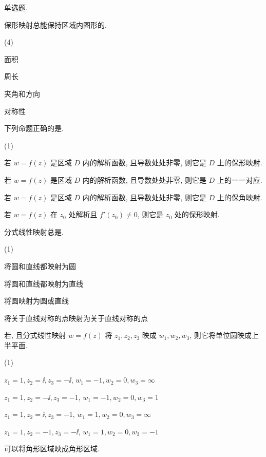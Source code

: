 \begin{homework}
  \item 单选题.
  \begin{homework}
    \item 保形映射总能保持区域内图形的\fillbrace{}.
    \begin{exchoice}(4)
      \item 面积
      \item 周长
      \item 夹角和方向
      \item 对称性
    \end{exchoice}
    \item 下列命题正确的是\fillbrace{}.
    \begin{exchoice}(1)
      \item 若 $w=f(z)$ 是区域 $D$ 内的解析函数, 且导数处处非零, 则它是 $D$ 上的保形映射.
      \item 若 $w=f(z)$ 是区域 $D$ 内的解析函数, 且导数处处非零, 则它是 $D$ 上的一一对应.
      \item 若 $w=f(z)$ 是区域 $D$ 内的解析函数, 且导数处处非零, 则它是 $D$ 上的保角映射.
      \item 若 $w=f(z)$ 在 $z_0$ 处解析且 $f'(z_0)\neq0$, 则它是 $z_0$ 处的保形映射.
    \end{exchoice}
    \item 分式线性映射总是\fillbrace{}.
    \begin{exchoice}(1)
      \item 将圆和直线都映射为圆
      \item 将圆和直线都映射为直线
      \item 将圆映射为圆或直线
      \item 将关于直线对称的点映射为关于直线对称的点
    \end{exchoice}
    \item 若\fillbrace{}, 且分式线性映射 $w=f(z)$ 将 $z_1,z_2,z_3$ 映成 $w_1,w_2,w_3$, 则它将单位圆映成上半平面.
    \begin{exchoice}(1)
      \item $z_1=1,z_2=\ii,z_3=-\ii$, $w_1=-1,w_2=0,w_3=\infty$
      \item $z_1=1,z_2=-\ii,z_3=-1$, $w_1=-1,w_2=0,w_3=1$
      \item $z_1=1,z_2=\ii,z_3=-1$, $w_1=1,w_2=0,w_3=\infty$
      \item $z_1=1,z_2=-1,z_3=-\ii$, $w_1=1,w_2=0,w_3=-1$
    \end{exchoice}
    \item \fillbrace{}可以将角形区域映成角形区域.

\end{homework}
\end{homework}
